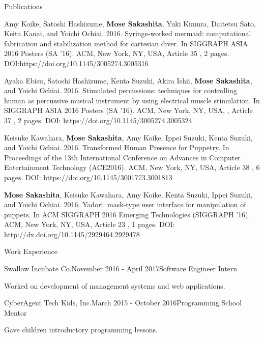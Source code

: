 \documentclass{resume} %
\begin{document}
\begin{rSection}{Publications}
\item Amy Koike, Satoshi Hashizume, \textbf{Mose Sakashita}, Yuki Kimura, Daitetsu Sato, Keita Kanai, and Yoichi Ochiai. 2016. Syringe-worked mermaid: computational fabrication and stabilization method for cartesian diver. In SIGGRAPH ASIA 2016 Posters (SA '16). ACM, New York, NY, USA, Article 35 , 2 pages. DOI:https://doi.org/10.1145/3005274.3005316

\item Ayaka Ebisu, Satoshi Hashizume, Kenta Suzuki, Akira Ishii, \textbf{Mose Sakashita}, and Yoichi Ochiai. 2016. Stimulated percussions: techniques for controlling human as percussive musical instrument by using electrical muscle stimulation. In SIGGRAPH ASIA 2016 Posters (SA '16). ACM, New York, NY, USA, , Article 37 , 2 pages. DOI: https://doi.org/10.1145/3005274.3005324

\item Keisuke Kawahara, \textbf{Mose Sakashita}, Amy Koike, Ippei Suzuki, Kenta Suzuki, and Yoichi Ochiai. 2016. Transformed Human Presence for Puppetry. In Proceedings of the 13th International Conference on Advances in Computer Entertainment Technology (ACE2016). ACM, New York, NY, USA, Article 38 , 6 pages. DOI: https://doi.org/10.1145/3001773.3001813

\item \textbf{Mose Sakashita}, Keisuke Kawahara, Amy Koike, Kenta Suzuki, Ippei Suzuki, and Yoichi Ochiai. 2016. Yadori: mask-type user interface for manipulation of puppets. In ACM SIGGRAPH 2016 Emerging Technologies (SIGGRAPH '16). ACM, New York, NY, USA, Article 23 , 1 pages. DOI: http://dx.doi.org/10.1145/2929464.2929478

\end{rSection}

\begin{rSection}{Work Experience}
\begin{rSubsection}{Swallow Incubate Co.}{November 2016 - April 2017}{Software Engineer Intern}{}
\item Worked on development of management systems and web applications.
\end{rSubsection}

\begin{rSubsection}{CyberAgent Tech Kids, Inc.}{March 2015 - October 2016}{Programming School Mentor}{}
\item Gave children introductory programming lessons.
\end{rSubsection}
\end{rSection}
\end{document}
